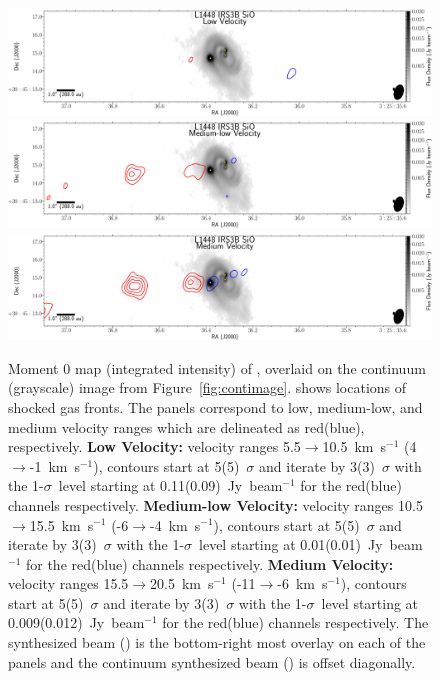 \begin{figure}[H]
   \begin{center}
\includegraphics[width=\textwidth]{img/L1448IRS3B-SiO_ultralow.pdf}
\includegraphics[width=\textwidth]{img/L1448IRS3B-SiO_low.pdf}
\includegraphics[width=\textwidth]{img/L1448IRS3B-SiO_medium.pdf}
   \end{center}
   \caption{Moment 0 map (integrated intensity) of \sio, overlaid on the continuum (grayscale) image from Figure~\ref{fig:contimage}. \sio\space shows locations of shocked gas fronts.  The panels correspond to low, medium-low, and medium velocity ranges which are delineated as red(blue), respectively. \textbf{Low Velocity:} velocity ranges 5.5$\rightarrow$10.5~km~s$^{-1}$ (4$\rightarrow$-1~km~s$^{-1}$), contours start at 5(5)~$\sigma$ and iterate by 3(3)~$\sigma$ with the 1-$\sigma$~level starting at 0.11(0.09)~Jy~beam$^{-1}$ for the red(blue) channels respectively. \textbf{Medium-low Velocity:} velocity ranges 10.5$\rightarrow$15.5~km~s$^{-1}$ (-6$\rightarrow$-4~km~s$^{-1}$), contours start at 5(5)~$\sigma$ and iterate by 3(3)~$\sigma$ with the 1-$\sigma$~level starting at 0.01(0.01)~Jy~beam$^{-1}$ for the red(blue) channels respectively. \textbf{Medium Velocity:} velocity ranges 15.5$\rightarrow$20.5~km~s$^{-1}$ (-11$\rightarrow$-6~km~s$^{-1}$), contours start at 5(5)~$\sigma$ and iterate by 3(3)~$\sigma$ with the 1-$\sigma$~level starting at 0.009(0.012)~Jy~beam$^{-1}$ for the red(blue) channels respectively. The \sio\space synthesized beam (\siobeam) is the bottom-right most overlay on each of the panels and the continuum synthesized beam (\contbeam) is offset diagonally.}\label{fig:siomomentmap}
\end{figure}

